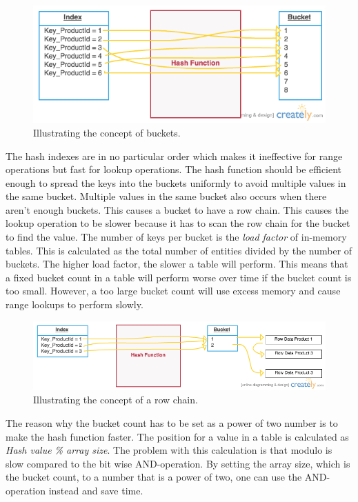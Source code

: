 \documentclass{cslthse-msc}
\begin{document}
\begin{figure}[H]
\begin{center}
\includegraphics[scale=0.5]{Pictures/buckets.png}
\caption{Illustrating the concept of buckets.}
\end{center}
\end{figure}

The hash indexes are in no particular order which makes it ineffective for range operations but fast for lookup operations. The hash function should be efficient enough to spread the keys into the buckets uniformly to avoid multiple values in the same bucket. Multiple values in the same bucket also occurs when there aren't enough buckets. This causes a bucket to have a row chain. This causes the lookup operation to be slower because it has to scan the row chain for the bucket to find the value. The number of keys per bucket is the \emph{load factor} of in-memory tables. This is calculated as the total number of entities divided by the number of buckets. The higher load factor, the slower a table will perform. This means that a fixed bucket count in a table will perform worse over time if the bucket count is too small. However, a too large bucket count will use excess memory and cause range lookups to perform slowly. 

\begin{figure}[H]
\begin{center}
\includegraphics[scale=0.5]{Pictures/buckets2.png}
\caption{Illustrating the concept of a row chain.}
\end{center}
\end{figure}

The reason why the bucket count has to be set as a power of two number is to make the hash function faster. The position for a value in a table is calculated as \emph{Hash value \% array size}. The problem with this calculation is that modulo is slow compared to the bit wise AND-operation. By setting the array size, which is the bucket count, to a number that is a power of two, one can use the AND-operation instead and save time.
\end{document}
